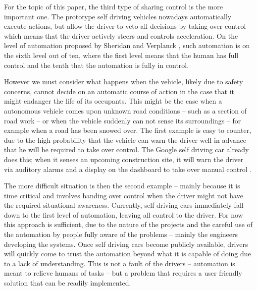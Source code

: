 \documentclass{acm_proc_article-sp}
\begin{document}
For the topic of this paper, the third type of sharing control is the more important one.
The prototype self driving vehicles nowadays automatically execute actions, but allow the driver to veto all decisions by taking over control – which means that the driver actively steers and controls acceleration.
On the level of automation proposed by Sheridan and Verplanck \cite{sheridan:human}, such automation is on the sixth level out of ten, where the first level means that the human has full control and the tenth that the automation is fully in control.

However we must consider what happens when the vehicle, likely due to safety concerns, cannot decide on an automatic course of action in the case that it might endanger the life of its occupants.
This might be the case when a autonomous vehicle comes upon unknown road conditions – such as a section of road work – or when the vehicle suddenly can not sense its surroundings – for example when a road has been snowed over.
The first example is easy to counter, due to the high probability that the vehicle can warn the driver well in advance that he will be required to take over control.
The Google self driving car already does this; when it senses an upcoming construction site, it will warn the driver via auditory alarms and a display on the dashboard to take over manual control \cite{www:newyorker_google_car}.

The more difficult situation is then the second example – mainly because it is time critical and involves handing over control when the driver might not have the required situational awareness.
Currently, self driving cars immediately fall down to the first level of automation, leaving all control to the driver.
For now this approach is sufficient, due to the nature of the projects and the careful use of the automation by people fully aware of the problems – mainly the engineers developing the systems.
Once self driving cars become publicly available, drivers will quickly come to trust the automation beyond what it is capable of doing due to a lack of understanding.
This is not a fault of the drivers – automation is meant to relieve humans of tasks – but a problem that requires a user friendly solution that can be readily implemented.
\end{document}
